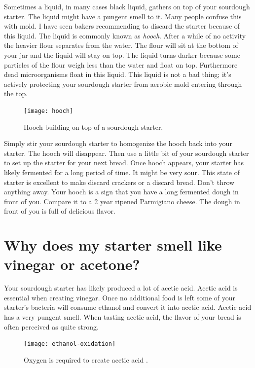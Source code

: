 Sometimes a liquid, in many cases black liquid, gathers on top
of your sourdough starter. The liquid might have a pungent
smell to it. Many people confuse this with mold. I have seen
bakers recommending to discard the starter because of this liquid.
The liquid is commonly known as {\it hooch}. After a while
of no activity the heavier flour separates from the water. The flour
will sit at the bottom of your jar and the liquid will stay on top.
The liquid turns darker because some particles of the flour weigh
less than the water and float on top. Furthermore dead microorganisms
float in this liquid. This liquid is not a bad thing; it's actively
protecting your sourdough starter from aerobic mold entering through
the top.

\begin{figure}[!htb]
  \centering
  \texttt{[image: hooch]}
  \caption{Hooch building on top of a sourdough starter. \cite{liquid+on+starter}}
  \label{fig:hooch}
\end{figure}

Simply stir your sourdough starter to homogenize the hooch back
into your starter. The hooch will disappear. Then use a little bit of
your sourdough starter to set up the starter for your next bread.
Once hooch appears, your starter has likely fermented for a long
period of time. It might be very sour. This state of starter
is excellent to make discard crackers or a discard bread. Don't throw
anything away. Your hooch is a sign that you have a long fermented
dough in front of you. Compare it to a 2 year ripened Parmigiano cheese.
The dough in front of you is full of delicious flavor.

\section{Why does my starter smell like vinegar or acetone?}

Your sourdough starter has likely produced a lot of acetic acid.
Acetic acid is essential when creating vinegar. Once no additional
food is left some of your starter's bacteria will consume ethanol
and convert it into acetic acid. Acetic acid has a very pungent smell.
When tasting acetic acid, the flavor of your bread is often perceived
as quite strong.

\begin{figure}[!htb]
  \centering
  \texttt{[image: ethanol-oxidation]}
  \caption{Oxygen is required to create acetic acid \cite{acetic+acid+production}.}
  \label{fig:ethanol-oxidation}
\end{figure}

